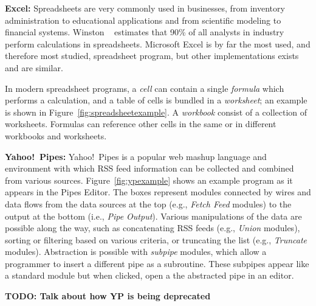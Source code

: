 \documentclass{sig-alternate}
\newcommand{\todo}[1]{\textbf{TODO: #1}}
\begin{document}
\noindent \textbf{Excel:} Spreadsheets are very commonly used in businesses, from inventory administration to educational applications and from scientific modeling to financial systems.
Winston ~\cite{Wins2001} estimates that 90\% of all analysts in industry perform calculations in spreadsheets. 
Microsoft Excel is by far the most used, and therefore most studied, spreadsheet program, but other implementations exists and are similar.

In modern spreadsheet programs, a \textit{cell} can contain a single \textit{formula} which performs a calculation, and a table of cells is bundled in a \textit{worksheet}; an example is shown in Figure~\ref{fig:spreadsheetexample}. 
A \textit{workbook} consist of a collection of worksheets.
Formulas can reference other cells in the same or in different workbooks and worksheets.


\noindent \textbf{Yahoo!\ Pipes:}
Yahoo!\ Pipes is a popular web mashup language and environment with which RSS feed information can be collected and combined from various sources.  Figure~\ref{fig:ypexample} shows an example program as it appears in the Pipes Editor. The boxes represent modules connected by wires and data flows from the data sources at the top  (e.g., \emph{Fetch Feed} modules) to the output at the bottom (i.e., \emph{Pipe Output}). Various manipulations of the data are possible along the  way, such as concatenating RSS feeds (e.g., \emph{Union} modules), sorting  or filtering based on various criteria, or truncating the list (e.g., \emph{Truncate} modules). 
Abstraction is possible with \emph{subpipe} modules, which allow a programmer to insert a different pipe as a subroutine. These subpipes appear like a standard module but when clicked, open a the abstracted pipe in an editor. 

\todo{Talk about how YP is being deprecated}
\end{document}
